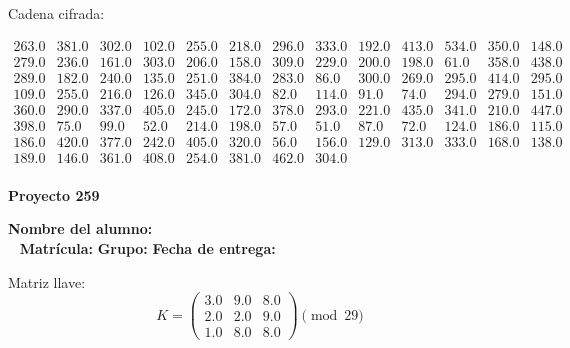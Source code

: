 \documentclass[12pt]{article}
\begin{document}
Cadena cifrada:
\begin{center}
$\begin{array}{lllllllllllll}
263.0 & 381.0 & 302.0 & 102.0 & 255.0 & 218.0 & 296.0 & 333.0 & 192.0 & 413.0 & 534.0 & 350.0 & 148.0\\
279.0 & 236.0 & 161.0 & 303.0 & 206.0 & 158.0 & 309.0 & 229.0 & 200.0 & 198.0 & 61.0 & 358.0 & 438.0\\
289.0 & 182.0 & 240.0 & 135.0 & 251.0 & 384.0 & 283.0 & 86.0 & 300.0 & 269.0 & 295.0 & 414.0 & 295.0\\
109.0 & 255.0 & 216.0 & 126.0 & 345.0 & 304.0 & 82.0 & 114.0 & 91.0 & 74.0 & 294.0 & 279.0 & 151.0\\
360.0 & 290.0 & 337.0 & 405.0 & 245.0 & 172.0 & 378.0 & 293.0 & 221.0 & 435.0 & 341.0 & 210.0 & 447.0\\
398.0 & 75.0 & 99.0 & 52.0 & 214.0 & 198.0 & 57.0 & 51.0 & 87.0 & 72.0 & 124.0 & 186.0 & 115.0\\
186.0 & 420.0 & 377.0 & 242.0 & 405.0 & 320.0 & 56.0 & 156.0 & 129.0 & 313.0 & 333.0 & 168.0 & 138.0\\
189.0 & 146.0 & 361.0 & 408.0 & 254.0 & 381.0 & 462.0 & 304.0\\
\end{array}$
\end{center}

\newpage


\textbf{Proyecto 259}

\textbf{Nombre del alumno:} \underline{\hspace{13cm}}\\\
\vspace{1cm}
\textbf{Matrícula:} \underline{\hspace{4cm}} \hspace{1cm}
\textbf{Grupo:} \underline{\hspace{2cm}}
\textbf{Fecha de entrega:} \underline{\hspace{2cm}}

\medskip

Matriz llave:
\[
K = \begin{pmatrix}
3.0 & 9.0 & 8.0\\
2.0 & 2.0 & 9.0\\
1.0 & 8.0 & 8.0
\end{pmatrix} \pmod{29}
\]
\end{document}
